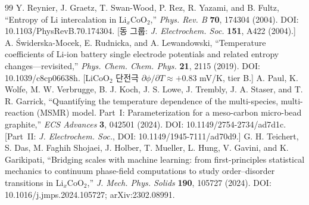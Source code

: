 \documentclass[11pt,a4paper]{article}
\begin{document}
\begin{thebibliography}{99}
 Y. Reynier, J. Graetz, T. Swan-Wood, P. Rez, R. Yazami, and B. Fultz, ``Entropy of Li intercalation in Li$_x$CoO$_2$,'' \emph{Phys. Rev. B} \textbf{70}, 174304 (2004). DOI: 10.1103/PhysRevB.70.174304. [동 그룹: \emph{J. Electrochem. Soc.} \textbf{151}, A422 (2004).]
 A. {\'S}widerska-Mocek, E. Rudnicka, and A. Lewandowski, ``Temperature coefficients of Li-ion battery single electrode potentials and related entropy changes---revisited,'' \emph{Phys. Chem. Chem. Phys.} \textbf{21}, 2115 (2019). DOI: 10.1039/c8cp06638h. [LiCoO$_2$ 단전극 $\partial\phi/\partial T\approx+0.83$ mV/K, tier B.]
 A. Paul, K. Wolfe, M. W. Verbrugge, B. J. Koch, J. S. Lowe, J. Trembly, J. A. Staser, and T. R. Garrick, ``Quantifying the temperature dependence of the multi-species, multi-reaction (MSMR) model. Part~I: Parameterization for a meso-carbon micro-bead graphite,'' \emph{ECS Advances} \textbf{3}, 042501 (2024). DOI: 10.1149/2754-2734/ad7d1c. [Part~II: \emph{J. Electrochem. Soc.}, DOI: 10.1149/1945-7111/ad70d9.]
 G. H. Teichert, S. Das, M. Faghih Shojaei, J. Holber, T. Mueller, L. Hung, V. Gavini, and K. Garikipati, ``Bridging scales with machine learning: from first-principles statistical mechanics to continuum phase-field computations to study order--disorder transitions in Li$_x$CoO$_2$,'' \emph{J. Mech. Phys. Solids} \textbf{190}, 105727 (2024). DOI: 10.1016/j.jmps.2024.105727; arXiv:2302.08991.
\end{thebibliography}
\end{document}
